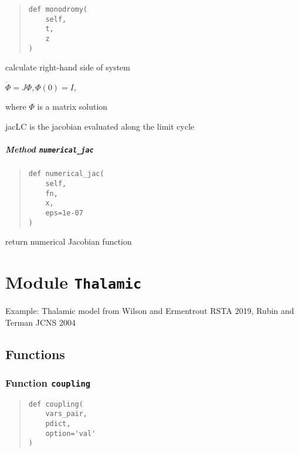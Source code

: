 \documentclass[english,a4paper,oneside]{article}
\let\oldsubparagraph\subparagraph
\renewcommand{\subparagraph}[1]{\oldsubparagraph{#1}\mbox{}}
\begin{document}
\begin{quote}
\begin{verbatim}
def monodromy(
    self,
    t,
    z
)
\end{verbatim}
\end{quote}

calculate right-hand side of system

\(\dot \Phi = J\Phi, \Phi(0)=I\),

where \(\Phi\) is a matrix solution

jacLC is the jacobian evaluated along the limit cycle

\hypertarget{StrongCoupling.StrongCoupling.numerical_jac}{%
\subparagraph{\texorpdfstring{Method
\texttt{numerical\_jac}}{Method numerical\_jac}}\label{StrongCoupling.StrongCoupling.numerical_jac}}

\begin{quote}
\begin{verbatim}
def numerical_jac(
    self,
    fn,
    x,
    eps=1e-07
)
\end{verbatim}
\end{quote}

return numerical Jacobian function

\hypertarget{Thalamic}{%
\section{\texorpdfstring{Module
\texttt{Thalamic}}{Module Thalamic}}\label{Thalamic}}

Example: Thalamic model from Wilson and Ermentrout RSTA 2019, Rubin and
Terman JCNS 2004

\hypertarget{functions-1}{%
\subsection{Functions}\label{functions-1}}

\hypertarget{Thalamic.coupling}{%
\subsubsection{\texorpdfstring{Function
\texttt{coupling}}{Function coupling}}\label{Thalamic.coupling}}

\begin{quote}
\begin{verbatim}
def coupling(
    vars_pair,
    pdict,
    option='val'
)
\end{verbatim}
\end{quote}
\end{document}
